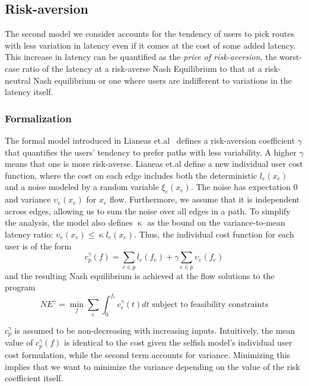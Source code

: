 \subsection{Risk-aversion}
The second model we consider accounts for the tendency of users to pick routes with less variation in latency even if it comes at the cost of some added latency. This increase in latency can be quantified as the {\em{price of risk-aversion}},
the worst-case ratio of the latency at a risk-averse Nash Equilibrium to that at a risk-neutral
Nash equilibrium or one where users are indifferent to variations in the latency itself.


\subsubsection{Formalization} The formal model introduced in Lianeas et.al~\cite{risk-averse} defines 
a risk-aversion coefficient $\gamma$ that quantifies the users' tendency to prefer paths with less variability. 
A higher $\gamma$ means that one is more risk-averse. Lianeas et.al define a new individual user cost function, where 
the cost on each edge includes both the deterministic $l_e(x_e)$ and a noise modeled by a random variable $\xi_e(x_e)$. The noise has expectation $0$ and variance $\upsilon_e(x_e)$ for $x_e$ flow. Furthermore, we assume that it is independent across edges, allowing us to sum the noise over all edges in a path. To simplify the analysis, the model also defines $\upkappa$ as the bound on the variance-to-mean latency ratio:
$\upsilon_e(x_e) \leq \upkappa l_e(x_e)$.
Thus, the individual cost function for each user is of the form
$$c^\gamma_p(f) = \sum_{e \in p}l_e(f_e) + \gamma \sum_{e \in p}\upsilon_e(f_e)$$
and the resulting Nash equilibrium is achieved at the flow solutions to the program
$$NE^\gamma= \min_f\sum_e\int_0^{f_e}c_e^\gamma(t)dt \text{ subject to feasibility constraints}$$

$c^\gamma_p$ is assumed to be non-decreasing with increasing inputs. Intuitively, the mean value of $c^\gamma_p(f)$ is identical to the cost given the selfish model's individual user cost formulation, while the second term accounts for variance. Minimizing this implies that we want to minimize the variance depending on the value of the risk coefficient itself.

